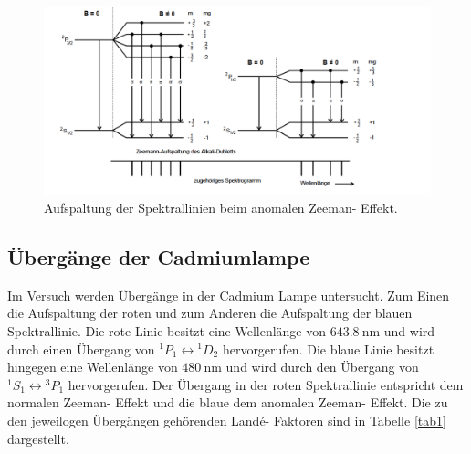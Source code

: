 \FloatBarrier
\begin{figure}
  \centering
  \includegraphics[scale=0.4]{anomal.PNG}
  \caption{Aufspaltung der Spektrallinien beim anomalen Zeeman- Effekt. \cite{Q1}}
  \label{abb3}
\end{figure}
\FloatBarrier

\subsection{Übergänge der Cadmiumlampe}
Im Versuch werden Übergänge in der Cadmium Lampe untersucht. Zum Einen die Aufspaltung der roten
und zum Anderen die Aufspaltung der blauen Spektrallinie.
Die rote Linie besitzt eine Wellenlänge von $\SI{643,8}{\nano\meter}$ und wird durch einen
Übergang von ${}^1P_1\leftrightarrow{}^1D_2$ hervorgerufen. Die blaue Linie besitzt
hingegen eine Wellenlänge von $\SI{480}{\nano \meter}$ und wird durch den Übergang von
${}^1S_1\leftrightarrow{}^3P_1$ hervorgerufen.
Der Übergang in der roten Spektrallinie entspricht dem normalen Zeeman- Effekt und die
blaue dem anomalen Zeeman- Effekt.
Die zu den jeweilogen Übergängen gehörenden Landé- Faktoren sind in Tabelle \ref{tab1} dargestellt.
\FloatBarrier

